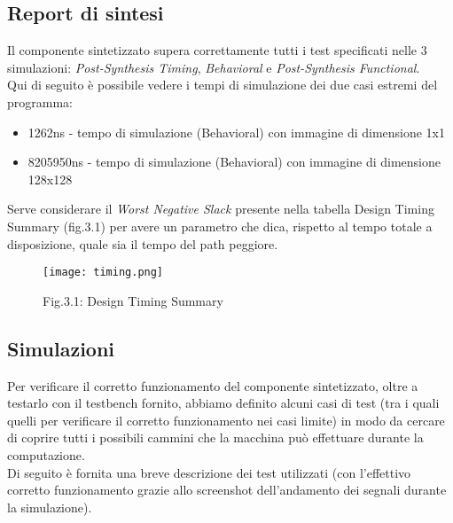 \documentclass[12pt, table, xcdraw]{article}
\begin{document}
\subsection{Report di sintesi}


Il componente sintetizzato supera correttamente tutti i test specificati nelle 3 simulazioni:
\emph{Post-Synthesis Timing}, \emph{Behavioral} e \emph{Post-Synthesis Functional}.\\
Qui di seguito è possibile vedere i tempi di simulazione dei due casi estremi del programma:
\begin{itemize}
\item 1262ns - tempo di simulazione (Behavioral) con immagine di dimensione 1x1
\item 8205950ns - tempo di simulazione (Behavioral) con immagine di dimensione 128x128
\end{itemize}

Serve considerare il \emph{Worst Negative Slack} presente nella tabella Design Timing Summary (fig.3.1)
per avere un parametro che dica, rispetto al tempo totale a disposizione, quale sia il tempo del
path peggiore.
\begin{figure}[h!]
\begin{center}
  \texttt{[image: timing.png]}
\caption*{Fig.3.1: Design Timing Summary}
\end{center}
\end{figure}
\FloatBarrier


\subsection{Simulazioni}
Per verificare il corretto funzionamento del componente sintetizzato, oltre a testarlo con il testbench fornito, abbiamo definito alcuni casi di test (tra i quali quelli per verificare il corretto funzionamento nei casi limite) in modo da cercare di coprire tutti i possibili cammini che la macchina può effettuare durante la computazione.\\
Di seguito è fornita una breve descrizione dei test utilizzati (con l'effettivo corretto funzionamento grazie allo screenshot dell’andamento dei segnali durante la simulazione).\\
\end{document}
